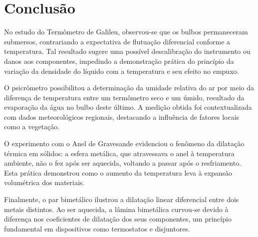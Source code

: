 \section{Conclusão} 
No estudo do Termômetro de Galileu, observou-se que os bulbos permaneceram submersos, contrariando a expectativa de flutuação diferencial conforme a temperatura. Tal resultado sugere uma possível descalibração do instrumento ou danos aos componentes, impedindo a demonstração prática do princípio da variação da densidade do líquido com a temperatura e seu efeito no empuxo.

O psicrômetro possibilitou a determinação da umidade relativa do ar por meio da diferença de temperatura entre um termômetro seco e um úmido, resultado da evaporação da água no bulbo deste último. A medição obtida foi contextualizada com dados meteorológicos regionais, destacando a influência de fatores locais como a vegetação.

O experimento com o Anel de Gravesande evidenciou o fenômeno da dilatação térmica em sólidos: a esfera metálica, que atravessava o anel à temperatura ambiente, não o fez após ser aquecida, voltando a passar após o resfriamento. Esta prática demonstrou como o aumento da temperatura leva à expansão volumétrica dos materiais.

Finalmente, o par bimetálico ilustrou a dilatação linear diferencial entre dois metais distintos. Ao ser aquecida, a lâmina bimetálica curvou-se devido à diferença nos coeficientes de dilatação dos seus componentes, um princípio fundamental em dispositivos como termostatos e disjuntores.
